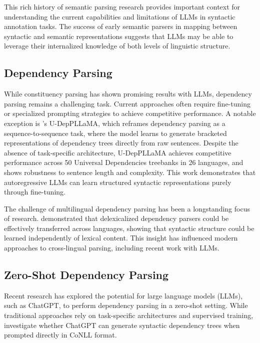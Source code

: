 This rich history of semantic parsing research provides important context for understanding the current capabilities and limitations of LLMs in syntactic annotation tasks. The success of early semantic parsers in mapping between syntactic and semantic representations suggests that LLMs may be able to leverage their internalized knowledge of both levels of linguistic structure.

\subsection{Dependency Parsing}

While constituency parsing has shown promising results with LLMs, dependency parsing remains a challenging task. Current approaches often require fine-tuning or specialized prompting strategies to achieve competitive performance. A notable exception is \citet{hromei2024udeppllama}'s U-DepPLLaMA, which reframes dependency parsing as a sequence-to-sequence task, where the model learns to generate bracketed representations of dependency trees directly from raw sentences. Despite the absence of task-specific architecture, U-DepPLLaMA achieves competitive performance across 50 Universal Dependencies treebanks in 26 languages, and shows robustness to sentence length and complexity. This work demonstrates that autoregressive LLMs can learn structured syntactic representations purely through fine-tuning.

The challenge of multilingual dependency parsing has been a longstanding focus of research. \citet{mcdonald2011multi} demonstrated that delexicalized dependency parsers could be effectively transferred across languages, showing that syntactic structure could be learned independently of lexical content. This insight has influenced modern approaches to cross-lingual parsing, including recent work with LLMs.

\subsection{Zero-Shot Dependency Parsing}

Recent research has explored the potential for large language models (LLMs), such as ChatGPT, to perform dependency parsing in a zero-shot setting. While traditional approaches rely on task-specific architectures and supervised training, \citet{lin2023chatgpt} investigate whether ChatGPT can generate syntactic dependency trees when prompted directly in CoNLL format.

